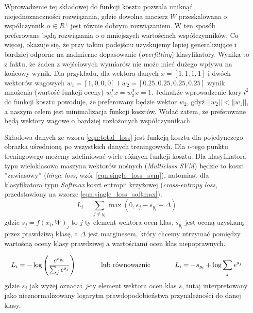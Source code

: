 Wprowadzenie tej składowej do funkcji kosztu pozwala uniknąć niejednoznaczności rozwiązania, gdzie dowolna macierz $W$ przeskalowana o współczynnik $\alpha \in R^+$ jest równie dobrym rozwiązaniem.
W ten sposób preferowane będą rozwiązania o o mniejszych wartościach współczynników.
Co więcej, okazuje się, że przy takim podejściu uzyskujemy lepiej generalizujące i bardziej odporne na nadmierne dopasowanie (\textit{overfitting}) klasyfikatory.
Wynika to z faktu, że żaden z wejściowych wymiarów nie może mieć dużego wpływu na końcowy wynik.
Dla przykładu, dla wektora danych $x = [1,1,1,1]$ i dwóch wektorów wagowych $w_1 = [1,0,0,0]$ i $w_2 = [0.25,0.25,0.25,0.25]$ wynik mnożenia (wartość funkcji oceny) $w_1^Tx = w_2^Tx = 1$.
Jednakże wprowadzenie kary $l^2$ do funkcji kosztu powoduje, że preferowany będzie wektor $w_2$, gdyż $||w_2|| < ||w_1||$, a naszym celem jest minimalizacja funkcji kosztów.
Widać zatem, że preferowane będą wektory wagowe o bardziej rozłożonych współczynnikach.

Składowa danych ze wzoru \ref{eqn:total_loss} jest funkcją kosztu dla pojedynczego obrazka uśrednioną po wszystkich danych treningowych.
Dla $i$-tego punktu treningowego możemy zdefiniować wiele różnych funkcji kosztu.
Dla klasyfikatora typu wieloklasowa maszyna wektorów nośnych (\textit{Multiclass SVM}) będzie to koszt ''zawiasowy'' (\textit{hinge loss}, wzór \ref{eqn:single_loss_svm}), natomiast dla klasyfikatora typu \textit{Softmax} koszt entropii krzyżowej (\textit{cross-entropy loss}, przedstawiony na wzorze \ref{eqn:single_loss_softmax}).
\begin{equation}\label{eqn:single_loss_svm}
L_i = \sum_{j\neq y_i} \max(0, s_j - s_{y_i} + \Delta)
\end{equation}
gdzie $s_j = f(x_i, W)_j$ to $j$-ty element wektora ocen klas, $s_{y_i}$ jest oceną uzyskaną przez prawdziwą klasę, a $\Delta$ jest marginesem, który chcemy utrzymać pomiędzy wartością oceny klasy prawdziwej a wartościami ocen klas niepoprawnych.

\begin{equation}\label{eqn:single_loss_softmax}
L_i = -\log\left(\frac{e^{s_{y_i}}}{ \sum_j e^{s_j} }\right) \hspace{0.5in} \text{lub równoważnie} \hspace{0.5in} L_i = -s_{y_i} + \log\sum_j e^{s_j}
\end{equation}
gdzie $s_j$ jak wyżej oznacza $j$-ty element wektora ocen klas $s$, tutaj interpretowany jako nieznormalizowany logarytm prawdopodobieństwa przynależności do danej klasy.

